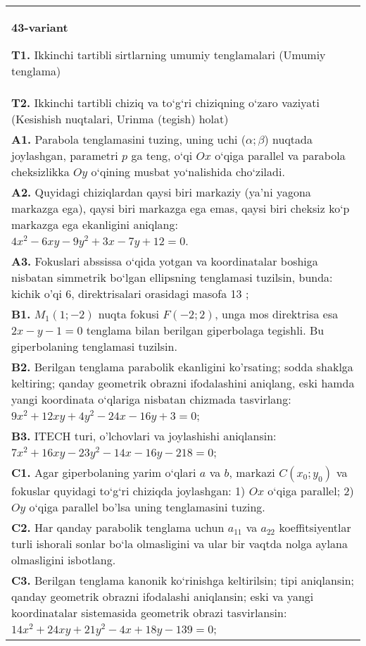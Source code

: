 \documentclass{article}
\begin{document}
\begin{tabular}{m{17cm}}
\textbf{43-variant}
\newline

\textbf{T1.} Ikkinchi tartibli sirtlarning umumiy tenglamalari (Umumiy tenglama) \\
\textbf{T2.} Ikkinchi tartibli chiziq va to‘g‘ri chiziqning o‘zaro vaziyati (Kesishish nuqtalari, Urinma (tegish) holat) \\
\textbf{A1.} Parabola tenglamasini tuzing, uning uchi ($\alpha; \beta$) nuqtada joylashgan, parametri $p$ ga teng, o‘qi $Ox$ o‘qiga parallel va parabola cheksizlikka $Oy$ o‘qining musbat yo‘nalishida cho‘ziladi. \\
\textbf{A2.} Quyidagi chiziqlardan qaysi biri markaziy (ya’ni yagona markazga ega), qaysi biri markazga ega emas, qaysi biri cheksiz ko‘p markazga ega ekanligini aniqlang: $4 x^2-6 x y-9 y^2+3 x-7 y+12=0$. \\
\textbf{A3.} Fokuslari abssissa o‘qida yotgan va koordinatalar boshiga nisbatan simmetrik bo‘lgan ellipsning tenglamasi tuzilsin, bunda: kichik o'qi 6, direktrisalari orasidagi masofa 13 ; \\
\textbf{B1.} $M_1 (1;-2) $ nuqta fokusi $F (-2; 2) $, unga mos direktrisa esa $2x-y-1=0$ tenglama bilan berilgan giperbolaga tegishli. Bu giperbolaning tenglamasi tuzilsin. \\
\textbf{B2.} Berilgan tenglama parabolik ekanligini ko'rsating; sodda shaklga keltiring; qanday geometrik obrazni ifodalashini aniqlang, eski hamda yangi koordinata o‘qlariga nisbatan chizmada tasvirlang: $9 x^2+12 x y+4 y^2-24 x-16 y+3=0$; \\
\textbf{B3.} ITECH turi, o'lchovlari va joylashishi aniqlansin: $7 x^2+16 x y-23 y^2-14 x-16 y-218=0$; \\
\textbf{C1.} Agar giperbolaning yarim o‘qlari $a$ va $b$, markazi $C\left(x_0; y_0\right) $ va fokuslar quyidagi to‘g‘ri chiziqda joylashgan: 1) $O x$ o‘qiga parallel; 2) $O y$ o‘qiga parallel bo'lsa uning tenglamasini tuzing. \\
\textbf{C2.} Har qanday parabolik tenglama uchun $a_{11}$ va $a_{22}$ koeffitsiyentlar turli ishorali sonlar bo‘la olmasligini va ular bir vaqtda nolga aylana olmasligini isbotlang. \\
\textbf{C3.} Berilgan tenglama kanonik ko‘rinishga keltirilsin; tipi aniqlansin; qanday geometrik obrazni ifodalashi aniqlansin; eski va yangi koordinatalar sistemasida geometrik obrazi tasvirlansin: $14 x^2+24 x y+21 y^2-4 x+18 y-139=0$; \\

\end{tabular}
\vspace{1cm}
\end{document}

